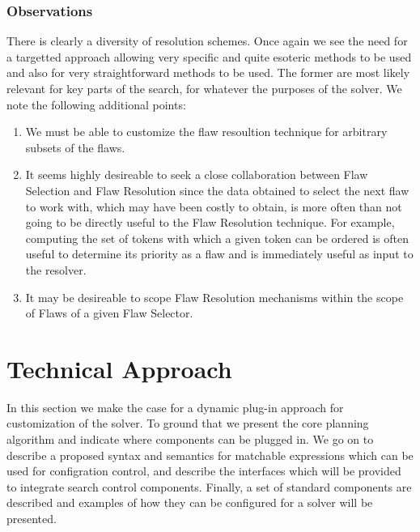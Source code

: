 \documentclass[10pt, letterpaper, oneside]{article}
\begin{document}
\subsubsection{Observations}
There is clearly a diversity of resolution schemes. Once again we see the need for a targetted approach allowing very specific and quite esoteric methods to be used and also for very straightforward methods to be used. The former are most likely relevant for key parts of the search, for whatever the purposes of the solver. We note the following additional points:
\begin{enumerate}
\item We must be able to customize the flaw resoultion technique for arbitrary subsets of the flaws.
\item It seems highly desireable to seek a close collaboration between Flaw Selection and Flaw Resolution since the data obtained to select the next flaw to work with, which may have been costly to obtain, is more often than not going to be directly useful to the Flaw Resolution technique. For example, computing the set of tokens with which a given token can be ordered is often useful to determine its priority as a flaw and is immediately useful as input to the resolver. 
\item It may be desireable to scope Flaw Resolution mechanisms within the scope of Flaws of a given Flaw Selector.
\end{enumerate}


\section{Technical Approach}
In this section we make the case for a dynamic plug-in approach for customization of the solver. To ground that we present the core planning algorithm and indicate where components can be plugged in. We go on to describe a proposed syntax and semantics for matchable expressions which can be used for configration control, and describe the interfaces which will be provided to integrate search control components. Finally, a set of standard components are described and examples of how they can be configured for a solver will be presented.
\end{document}
